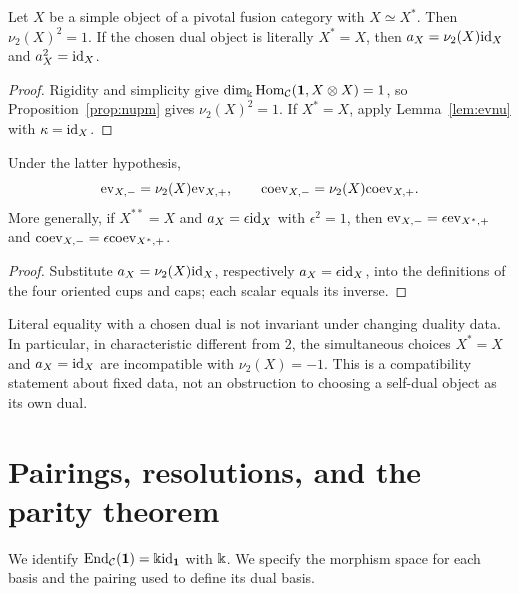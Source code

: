 \documentclass{amsart}
\begin{document}
\begin{proposition}\label{prop:pivoFS}
Let $X$ be a simple object of a pivotal fusion category with $X\simeq X^*$. Then
$\nu_2(X)^2=1$. If the chosen dual object is literally $X^*=X$, then
$a_X=\nu_2(X)\mathrm{id}_X$ and $a_X^2=\mathrm{id}_X$.
\end{proposition}
\begin{proof}
Rigidity and simplicity give $\dim_{\Bbbk}\mathrm{Hom}_{\mathcal{C}}({\bf 1},X\otimes X)=1$,
so Proposition~\ref{prop:nupm} gives $\nu_2(X)^2=1$.
If $X^*=X$, apply Lemma~\ref{lem:evnu} with $\kappa=\mathrm{id}_X$.
\end{proof}
\begin{lemma}\label{lem:biFS}
Under the latter hypothesis,
\[
 \mathrm{ev}_{X,-}=\nu_2(X)\mathrm{ev}_{X,+},\qquad
 \mathrm{coev}_{X,-}=\nu_2(X)\mathrm{coev}_{X,+}.
\]
More generally, if $X^{**}=X$ and $a_X=\epsilon\mathrm{id}_X$ with
$\epsilon^2=1$, then
$\mathrm{ev}_{X,-}=\epsilon\mathrm{ev}_{X^*,+}$ and
$\mathrm{coev}_{X,-}=\epsilon\mathrm{coev}_{X^*,+}$.
\end{lemma}
\begin{proof}
Substitute $a_X=\nu_2(X)\mathrm{id}_X$, respectively $a_X=\epsilon\mathrm{id}_X$,
into the definitions of the four oriented cups and caps; each scalar equals
its inverse.
\end{proof}
Literal equality with a chosen dual is not invariant
under changing duality data. In particular, in characteristic different from
$2$, the simultaneous choices $X^*=X$ and $a_X=\mathrm{id}_X$ are incompatible
with $\nu_2(X)=-1$. This is a compatibility statement about fixed data, not
an obstruction to choosing a self-dual object as its own dual.


\section{Pairings, resolutions, and the parity theorem}\label{sec:pre2}

We identify $\mathrm{End}_{\mathcal{C}}({\bf 1})=\Bbbk\mathrm{id}_{{\bf 1}}$ with $\Bbbk$.
We specify the morphism space for each basis and the pairing used to
define its dual basis.
\end{document}
